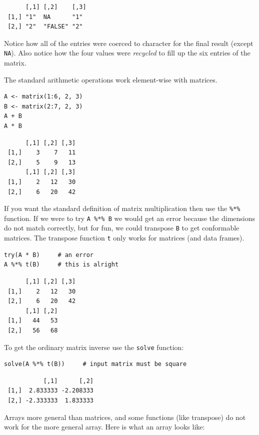 \documentclass[captions=tableheading]{scrbook}
\begin{document}
\begin{verbatim}
      [,1] [,2]    [,3]
 [1,] "1"  NA      "1" 
 [2,] "2"  "FALSE" "2"
\end{verbatim}

Notice how all of the entries were coerced to character for the final result (except \texttt{NA}). Also notice how the four values were \emph{recycled} to fill up the six entries of the matrix.

The standard arithmetic operations work element-wise with matrices.


\begin{verbatim}
A <- matrix(1:6, 2, 3)
B <- matrix(2:7, 2, 3)
A + B
A * B
\end{verbatim}

\begin{verbatim}
      [,1] [,2] [,3]
 [1,]    3    7   11
 [2,]    5    9   13
      [,1] [,2] [,3]
 [1,]    2   12   30
 [2,]    6   20   42
\end{verbatim}

If you want the standard definition of matrix multiplication then use the \texttt{\%*\%} function. If we were to try \texttt{A \%*\% B} we would get an error because the dimensions do not match correctly, but for fun, we could transpose \texttt{B} to get conformable matrices. The transpose function \texttt{t} only works for matrices (and data frames).


\begin{verbatim}
try(A * B)     # an error
A %*% t(B)     # this is alright
\end{verbatim}

\begin{verbatim}
      [,1] [,2] [,3]
 [1,]    2   12   30
 [2,]    6   20   42
      [,1] [,2]
 [1,]   44   53
 [2,]   56   68
\end{verbatim}

To get the ordinary matrix inverse use the \texttt{solve} function: 


\begin{verbatim}
solve(A %*% t(B))     # input matrix must be square
\end{verbatim}

\begin{verbatim}
           [,1]      [,2]
 [1,]  2.833333 -2.208333
 [2,] -2.333333  1.833333
\end{verbatim}

Arrays more general than matrices, and some functions (like transpose) do not work for the more general array. Here is what an array looks like: 
\end{document}
